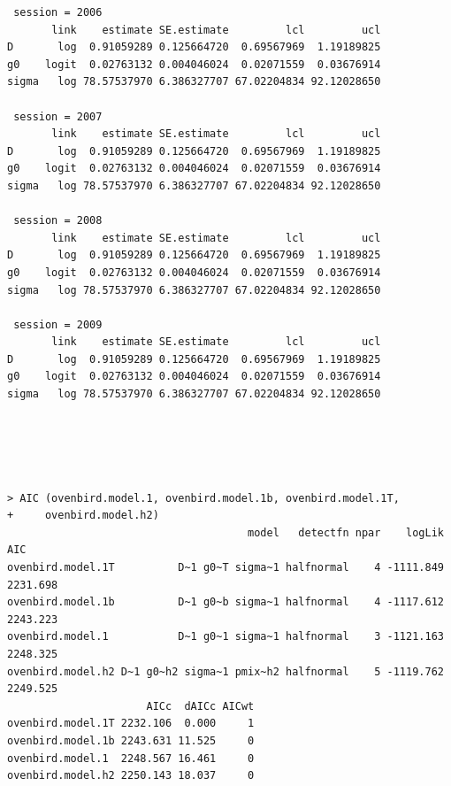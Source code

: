 \begin{verbatim}
 session = 2006 
       link    estimate SE.estimate         lcl         ucl
D       log  0.91059289 0.125664720  0.69567969  1.19189825
g0    logit  0.02763132 0.004046024  0.02071559  0.03676914
sigma   log 78.57537970 6.386327707 67.02204834 92.12028650

 session = 2007 
       link    estimate SE.estimate         lcl         ucl
D       log  0.91059289 0.125664720  0.69567969  1.19189825
g0    logit  0.02763132 0.004046024  0.02071559  0.03676914
sigma   log 78.57537970 6.386327707 67.02204834 92.12028650

 session = 2008 
       link    estimate SE.estimate         lcl         ucl
D       log  0.91059289 0.125664720  0.69567969  1.19189825
g0    logit  0.02763132 0.004046024  0.02071559  0.03676914
sigma   log 78.57537970 6.386327707 67.02204834 92.12028650

 session = 2009 
       link    estimate SE.estimate         lcl         ucl
D       log  0.91059289 0.125664720  0.69567969  1.19189825
g0    logit  0.02763132 0.004046024  0.02071559  0.03676914
sigma   log 78.57537970 6.386327707 67.02204834 92.12028650





> AIC (ovenbird.model.1, ovenbird.model.1b, ovenbird.model.1T,
+     ovenbird.model.h2)
                                      model   detectfn npar    logLik      AIC
ovenbird.model.1T          D~1 g0~T sigma~1 halfnormal    4 -1111.849 2231.698
ovenbird.model.1b          D~1 g0~b sigma~1 halfnormal    4 -1117.612 2243.223
ovenbird.model.1           D~1 g0~1 sigma~1 halfnormal    3 -1121.163 2248.325
ovenbird.model.h2 D~1 g0~h2 sigma~1 pmix~h2 halfnormal    5 -1119.762 2249.525
                      AICc  dAICc AICwt
ovenbird.model.1T 2232.106  0.000     1
ovenbird.model.1b 2243.631 11.525     0
ovenbird.model.1  2248.567 16.461     0
ovenbird.model.h2 2250.143 18.037     0

\end{verbatim}






